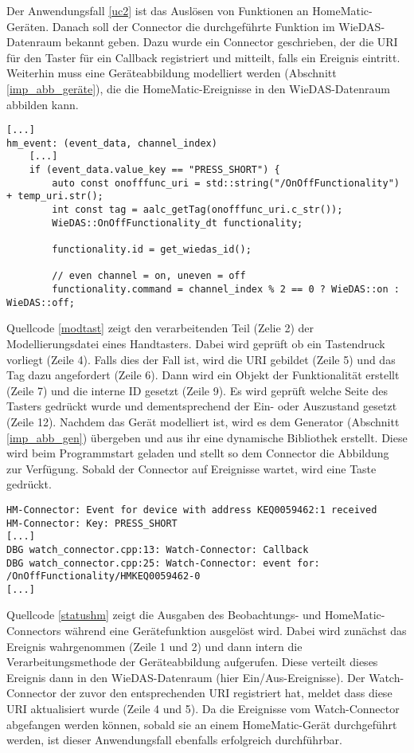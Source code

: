 Der Anwendungsfall \ref{uc2} ist das Auslösen von Funktionen an HomeMatic-Geräten.
Danach soll der Connector die durchgeführte Funktion im WieDAS-Datenraum bekannt geben.
Dazu wurde ein Connector geschrieben, der die URI für den Taster für ein Callback registriert
und mitteilt, falls ein Ereignis eintritt.
Weiterhin muss eine Geräteabbildung modelliert werden (Abschnitt \ref{imp_abb_geräte}), die die
HomeMatic-Ereignisse in den WieDAS-Datenraum abbilden kann.
\begin{lstlisting}[frame=single,caption={Ausschnitt der Modellierung des Tasters},label=modtast]
[...]
hm_event: (event_data, channel_index)
	[...]
	if (event_data.value_key == "PRESS_SHORT") {
		auto const onofffunc_uri = std::string("/OnOffFunctionality") + temp_uri.str();
		int const tag = aalc_getTag(onofffunc_uri.c_str());
		WieDAS::OnOffFunctionality_dt functionality;

		functionality.id = get_wiedas_id();

		// even channel = on, uneven = off
		functionality.command = channel_index % 2 == 0 ? WieDAS::on : WieDAS::off;
\end{lstlisting}

Quellcode \ref{modtast} zeigt den verarbeitenden Teil (Zelie 2) der Modellierungsdatei eines Handtasters.
Dabei wird geprüft ob ein Tastendruck vorliegt (Zeile 4).
Falls dies der Fall ist, wird die URI gebildet (Zeile 5) und das Tag dazu angefordert (Zeile 6).
Dann wird ein Objekt der Funktionalität erstellt (Zeile 7) und die interne ID gesetzt (Zeile 9).
Es wird geprüft welche Seite des Tasters gedrückt wurde und dementsprechend der Ein- oder Auszustand
gesetzt (Zeile 12).
Nachdem das Gerät modelliert ist, wird es dem Generator (Abschnitt \ref{imp_abb_gen}) übergeben und
aus ihr eine dynamische Bibliothek erstellt.
Diese wird beim Programmstart geladen und stellt so dem Connector die Abbildung zur Verfügung.
Sobald der Connector auf Ereignisse wartet, wird eine Taste gedrückt.

\begin{lstlisting}[frame=single,caption={Ausgaben der Connectoren bei Ereignissen von HomeMatic},label=statushm]
HM-Connector: Event for device with address KEQ0059462:1 received
HM-Connector: Key: PRESS_SHORT
[...]
DBG watch_connector.cpp:13: Watch-Connector: Callback
DBG watch_connector.cpp:25: Watch-Connector: event for: /OnOffFunctionality/HMKEQ0059462-0
[...]
\end{lstlisting}

Quellcode \ref{statushm} zeigt die Ausgaben des Beobachtungs- und HomeMatic-Connectors während eine Gerätefunktion
ausgelöst wird.
Dabei wird zunächst das Ereignis wahrgenommen (Zeile 1 und 2) und dann intern die Verarbeitungsmethode
der Geräteabbildung aufgerufen.
Diese verteilt dieses Ereignis dann in den WieDAS-Datenraum (hier Ein/Aus-Ereignisse).
Der Watch-Connector der zuvor den entsprechenden URI registriert hat, meldet dass diese URI aktualisiert wurde (Zeile 4 und 5).
Da die Ereignisse vom Watch-Connector abgefangen werden können, sobald sie an einem HomeMatic-Gerät durchgeführt werden,
ist dieser Anwendungsfall ebenfalls erfolgreich durchführbar.

